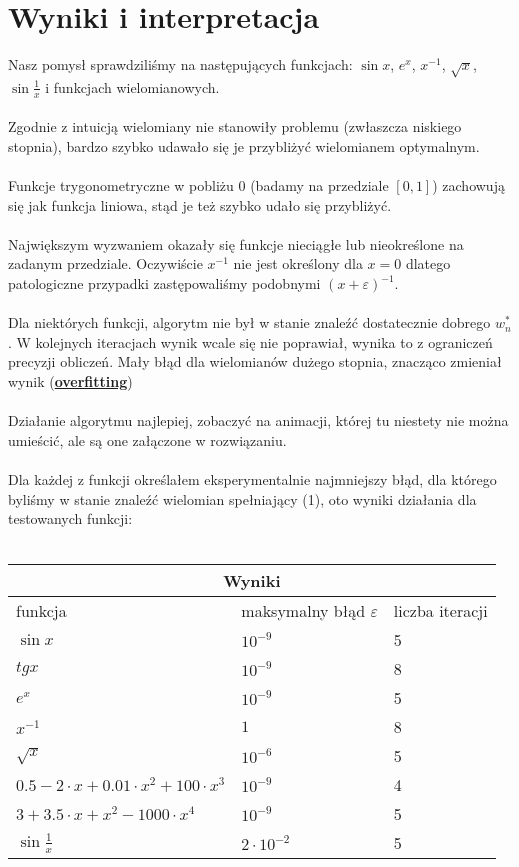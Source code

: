 \documentclass{article}
\begin{document}
\section{Wyniki i interpretacja}
Nasz pomysł sprawdziliśmy na następujących funkcjach: $\sin{x}$, $e^x$, $x^{-1}$, $\sqrt{x}$, $\sin{\frac{1}{x}}$ i funkcjach wielomianowych.\\\\
Zgodnie z intuicją wielomiany nie stanowiły problemu (zwłaszcza niskiego stopnia), bardzo szybko udawało się je przybliżyć wielomianem optymalnym.\\\\
Funkcje trygonometryczne w pobliżu $0$ (badamy na przedziale $[0,1]$) zachowują się jak funkcja liniowa, stąd je też szybko udało się przybliżyć.\\\\
Największym wyzwaniem okazały się funkcje nieciągłe lub nieokreślone na zadanym przedziale. Oczywiście $x^{-1}$ nie jest określony dla $x = 0$ dlatego patologiczne przypadki zastępowaliśmy podobnymi $(x+\varepsilon)^{-1}$.\\\\
Dla niektórych funkcji, algorytm nie był w stanie znaleźć dostatecznie dobrego $w_n^*$. W kolejnych iteracjach wynik wcale się nie poprawiał, wynika to z ograniczeń precyzji obliczeń. Mały błąd dla wielomianów dużego stopnia, znacząco zmieniał wynik (\href{https://en.wikipedia.org/wiki/Overfitting}{\textbf{overfitting}})\\\\
Działanie algorytmu najlepiej, zobaczyć na animacji, której tu niestety nie można umieścić, ale są one załączone w rozwiązaniu.\\\\
Dla każdej z funkcji określałem eksperymentalnie najmniejszy błąd, dla którego byliśmy w stanie znaleźć wielomian spełniający (1), oto wyniki działania dla testowanych funkcji:\\\\
\begin{tabular}{ |p{5cm}|p{3cm}|p{3cm}| }
 \hline
 \multicolumn{3}{|c|}{Wyniki} \\
 \hline
 funkcja   & maksymalny błąd $\varepsilon$ & liczba iteracji\\
 \hline
 $\sin{x}$&$10^{-9}$&5\\
 $tg{x}$&$10^{-9}$&8\\
 $e^x$&$10^{-9}$&5\\
 $x^{-1}$&$1$&8\\
 $\sqrt{x}$&$10^{-6}$&5\\
 $ 0.5-2\cdot x + 0.01\cdot x^2 + 100\cdot x^3$&$10^{-9}$&4\\
 $ 3 + 3.5\cdot x + x^2 - 1000\cdot x^4$&$10^{-9}$&5\\
 $ \sin{\frac{1}{x}}$&$2\cdot 10^{-2}$&5\\
 \hline
\end{tabular}
\end{document}

